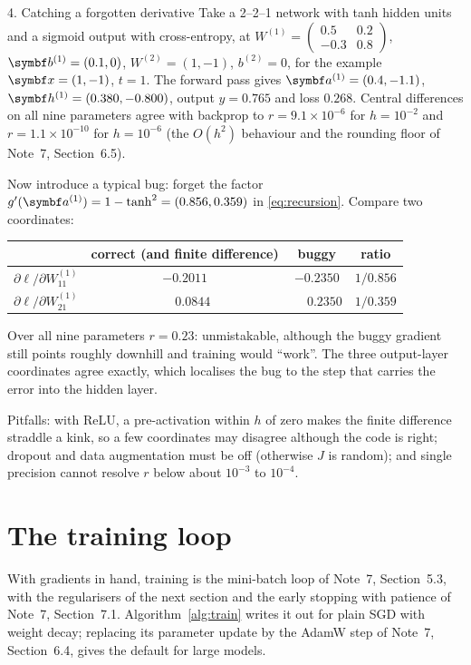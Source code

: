 \documentclass[11pt]{article}
\newcommand{\av}{\vect{a}}
\newcommand{\hv}{\vect{h}}
\newcommand{\bv}{\vect{b}}
\begin{document}
\begin{worked}{4. Catching a forgotten derivative}
Take a 2--2--1 network with tanh hidden units and a sigmoid output with cross-entropy, at
$W^{(1)} = \begin{pmatrix} 0.5 & 0.2 \\ -0.3 & 0.8\end{pmatrix}$, $\bv^{(1)} = (0.1, 0)$, $W^{(2)} = (1, -1)$, $b^{(2)} = 0$,
for the example $\x = (1, -1)$, $t = 1$. The forward pass gives $\av^{(1)} = (0.4, -1.1)$, $\hv^{(1)} = (0.380, -0.800)$,
output $y = 0.765$ and loss $0.268$. Central differences on all nine parameters agree with backprop to
$r = 9.1 \times 10^{-6}$ for $h = 10^{-2}$ and $r = 1.1 \times 10^{-10}$ for $h = 10^{-6}$ (the $O(h^2)$ behaviour and
the rounding floor of Note~7, Section~6.5).

Now introduce a typical bug: forget the factor $g'(\av^{(1)}) = 1 - \tanh^2 = (0.856, 0.359)$ in \eqref{eq:recursion}.
Compare two coordinates:
\begin{center}\small
\begin{tabular}{@{}lccc@{}}
\toprule
 & correct (and finite difference) & buggy & ratio \\
\midrule
$\partial\ell/\partial W^{(1)}_{11}$ & $-0.2011$ & $-0.2350$ & $1/0.856$ \\
$\partial\ell/\partial W^{(1)}_{21}$ & $\phantom{-}0.0844$ & $\phantom{-}0.2350$ & $1/0.359$ \\
\bottomrule
\end{tabular}
\end{center}
Over all nine parameters $r = 0.23$: unmistakable, although the buggy gradient still points roughly downhill and
training would ``work''. The three output-layer coordinates agree exactly, which localises the bug to the step that
carries the error into the hidden layer.
\end{worked}

Pitfalls: with ReLU, a pre-activation within $h$ of zero makes the finite difference straddle a kink, so a few
coordinates may disagree although the code is right; dropout and data augmentation must be off (otherwise $J$ is random);
and single precision cannot resolve $r$ below about $10^{-3}$ to $10^{-4}$.

\section{The training loop}\label{sec:loop}

With gradients in hand, training is the mini-batch loop of Note~7, Section~5.3, with the regularisers of the next
section and the early stopping with patience of Note~7, Section~7.1. Algorithm~\ref{alg:train} writes it out for plain SGD with weight
decay; replacing its parameter update by the AdamW step of Note~7, Section~6.4, gives the default for large models.
\end{document}
